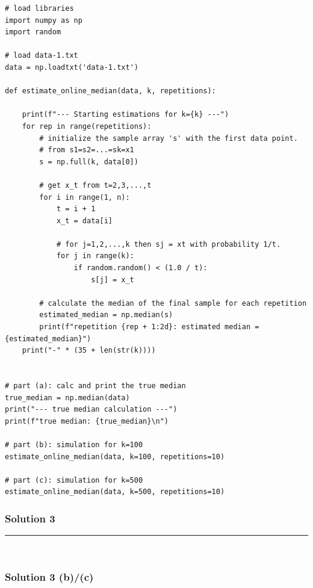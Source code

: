 \documentclass{article}
\begin{document}
\begin{lstlisting}
# load libraries
import numpy as np
import random

# load data-1.txt
data = np.loadtxt('data-1.txt')

def estimate_online_median(data, k, repetitions):

    print(f"--- Starting estimations for k={k} ---")
    for rep in range(repetitions):
        # initialize the sample array 's' with the first data point.
        # from s1=s2=...=sk=x1
        s = np.full(k, data[0])

        # get x_t from t=2,3,...,t
        for i in range(1, n):
            t = i + 1  
            x_t = data[i] 

            # for j=1,2,...,k then sj = xt with probability 1/t.
            for j in range(k):
                if random.random() < (1.0 / t):
                    s[j] = x_t
        
        # calculate the median of the final sample for each repetition
        estimated_median = np.median(s)
        print(f"repetition {rep + 1:2d}: estimated median = {estimated_median}")
    print("-" * (35 + len(str(k))))


# part (a): calc and print the true median
true_median = np.median(data)
print("--- true median calculation ---")
print(f"true median: {true_median}\n")

# part (b): simulation for k=100
estimate_online_median(data, k=100, repetitions=10)

# part (c): simulation for k=500
estimate_online_median(data, k=500, repetitions=10)
\end{lstlisting}

\newpage

\subsubsection*{Solution 3}
\noindent\rule{\textwidth}{0.4pt}\\
\subsubsection*{Solution 3 (b)/(c)}
\end{document}
